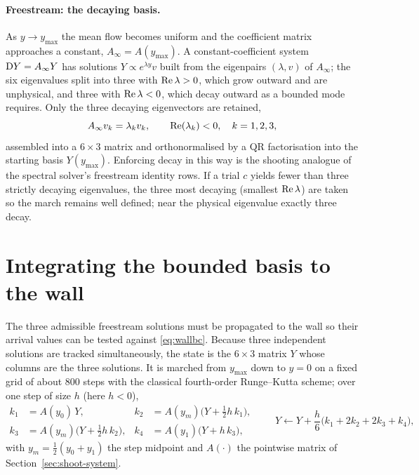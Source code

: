 \documentclass[11pt]{article}
\begin{document}
\paragraph{Freestream: the decaying basis.} As $y\to y_{\max}$ the mean flow becomes uniform and the
coefficient matrix approaches a constant, $A_\infty=A(y_{\max})$. A constant-coefficient system
$\mathrm{D} Y=A_\infty Y$ has solutions $Y\propto e^{\lambda y}v$ built from the eigenpairs $(\lambda,v)$ of
$A_\infty$; the six eigenvalues split into three with $\operatorname{Re}\lambda>0$, which grow outward and are
unphysical, and three with $\operatorname{Re}\lambda<0$, which decay outward as a bounded mode requires. Only the
three decaying eigenvectors are retained,
\begin{equation}\label{eq:decay}
  A_\infty v_k=\lambda_k v_k,\qquad \operatorname{Re}(\lambda_k)<0,\quad k=1,2,3,
\end{equation}
assembled into a $6\times3$ matrix and orthonormalised by a QR factorisation into the starting basis
$Y(y_{\max})$. Enforcing decay in this way is the shooting analogue of the spectral solver's
freestream identity rows. If a trial $c$ yields fewer than three strictly decaying eigenvalues, the
three most decaying (smallest $\operatorname{Re}\lambda$) are taken so the march remains well defined; near
the physical eigenvalue exactly three decay.

\section{Integrating the bounded basis to the wall}\label{sec:shoot-integrate}
The three admissible freestream solutions must be propagated to the wall so their arrival values can
be tested against \eqref{eq:wallbc}. Because three independent solutions are tracked simultaneously,
the state is the $6\times3$ matrix $Y$ whose columns are the three solutions. It is marched from
$y_{\max}$ down to $y=0$ on a fixed grid of about $800$ steps with the classical
fourth-order Runge--Kutta scheme; over one
step of size $h$ (here $h<0$),
\begin{equation}\label{eq:rk4}
\begin{aligned}
  k_1&=A(y_0)\,Y, & k_2&=A(y_m)\big(Y+\tfrac12 h\,k_1\big), \\
  k_3&=A(y_m)\big(Y+\tfrac12 h\,k_2\big), & k_4&=A(y_1)\big(Y+h\,k_3\big),
\end{aligned}
\qquad
Y\leftarrow Y+\frac{h}{6}\big(k_1+2k_2+2k_3+k_4\big),
\end{equation}
with $y_m=\tfrac12(y_0+y_1)$ the step midpoint and $A(\cdot)$ the pointwise matrix of
Section~\ref{sec:shoot-system}.
\end{document}
